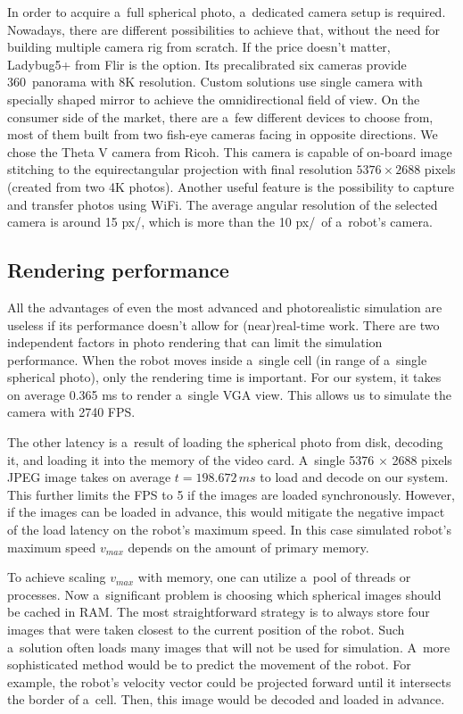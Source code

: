\documentclass{svproc}
\begin{document}
In order to acquire a~full spherical photo, a~dedicated camera setup is required. Nowadays, there are different 
possibilities to achieve that, without the need for building multiple camera rig from scratch. If the price 
doesn't matter, Ladybug5+ from Flir is the option. Its precalibrated six cameras provide 360\textdegree\ 
panorama with 8K resolution. Custom solutions use single camera with specially shaped mirror \cite{wkasik2017embedded}
to achieve the omnidirectional field of view. On the consumer side of the market, there are a~few different devices to choose from,
most of them built from two fish-eye cameras facing in opposite directions. We chose the Theta V camera from Ricoh. 
This camera is capable of on-board image stitching to the equirectangular projection with final resolution
$5376\times2688$ pixels (created from two 4K photos). Another useful feature is the possibility to capture
and transfer photos using WiFi. The average angular resolution of the selected camera is around 15 px/\textdegree, 
which is more than the 10 px/\textdegree\ of a~robot's camera. 

\subsection{Rendering performance}

All the advantages of even the most advanced and photorealistic simulation are useless if its performance 
doesn't allow for (near)real-time work. There are two independent factors in photo rendering that can limit
the simulation performance. When the robot moves inside a~single cell (in range of a~single spherical
photo), only the rendering time is important. For our system, it takes on average 0.365 ms to
render a~single VGA view. This allows us to simulate the camera with 2740 FPS. 

The other latency is a~result of loading the spherical photo from disk, decoding it, and loading it into the memory of the video card.
A~single 5376 $\times$ 2688 pixels JPEG image takes on average $t = 198.672\,ms$ to load and decode on our system.
This further limits the FPS to 5 if the images are loaded synchronously.
However, if the images can be loaded in advance, this would mitigate the negative impact of the load latency on the robot's maximum speed.
In this case simulated robot's maximum speed $v_{max}$ depends on the amount of primary memory.

To achieve scaling $v_{max}$ with memory, one can utilize a~pool of threads or processes.
Now a~significant problem is choosing which spherical images should be cached in RAM.
The most straightforward strategy is to always store four images that were taken closest to the current position of the robot.
Such a~solution often loads many images that will not be used for simulation.
A~more sophisticated method would be to predict the movement of the robot.
For example, the robot's velocity vector could be projected forward until it intersects the border of a~cell.
Then, this image would be decoded and loaded in advance.
\end{document}
